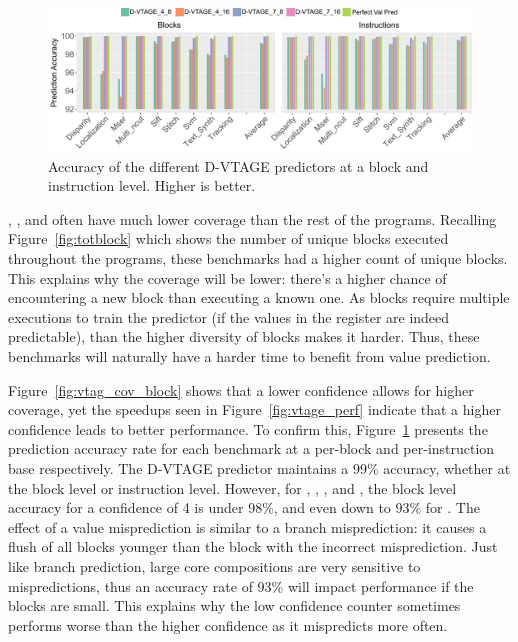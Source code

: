 \begin{figure}[t]
    \centering
    \includegraphics[width=1\textwidth]{chapter3/graphics/predAcc.pdf}
    \caption{Accuracy of the different D-VTAGE predictors at a block and instruction level. Higher is better.}
    \label{fig:vtag_accuracy_block}
\end{figure}

, ,  and  often have much lower coverage than the rest of the programs.
Recalling Figure~\ref{fig:totblock} which shows the number of unique blocks executed throughout the programs, these benchmarks had a higher count of unique blocks.
This explains why the coverage will be lower: there's a higher chance of encountering a new block than executing a known one.
As blocks require multiple executions to train the predictor (if the values in the register are indeed predictable), than the higher diversity of blocks makes it harder.
Thus, these benchmarks will naturally have a harder time to benefit from value prediction.

Figure~\ref{fig:vtag_cov_block} shows that a lower confidence allows for higher coverage, yet the speedups seen in Figure~\ref{fig:vtage_perf} indicate that a higher confidence leads to better performance.
To confirm this, Figure~\ref{fig:vtag_accuracy_block} presents the prediction accuracy rate for each benchmark at a per-block and per-instruction base respectively.
The D-VTAGE predictor maintains a 99\% accuracy, whether at the block level or instruction level.
However, for , , ,  and , the block level accuracy for a confidence of 4 is under 98\%, and even down to 93\% for .
The effect of a value misprediction is similar to a branch misprediction: it causes a flush of all blocks younger than the block with the incorrect misprediction.
Just like branch prediction, large core compositions are very sensitive to mispredictions, thus an accuracy rate of 93\% will impact performance if the blocks are small.
This explains why the low confidence counter sometimes performs worse than the higher confidence as it mispredicts more often.

